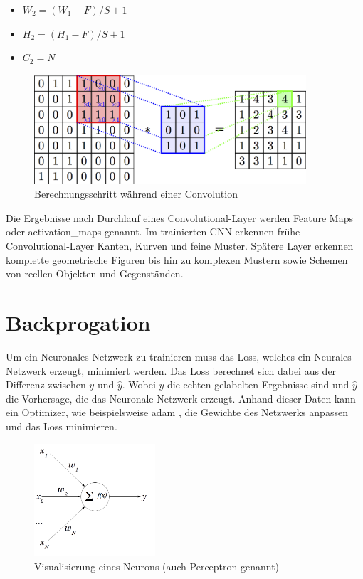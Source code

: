 \begin{itemize}
	\item $ W_2 = (W_1 - F) / S + 1 $
	\item $ H_2 = (H_1 - F) / S + 1 $
	\item $ C_2 = N $
\end{itemize}

\begin{figure}[H]
	\centering
	\includegraphics[width=0.90\textwidth]{resources/content/cnn/convolution_croped.png}
	\caption{Berechnungsschritt während einer Convolution \cite{convolution_img}}
	\label{img:convolution_img}
\end{figure}

Die Ergebnisse nach Durchlauf eines Convolutional-Layer werden Feature Maps oder \gls{activation_map}s genannt. Im trainierten CNN erkennen frühe Convolutional-Layer Kanten, Kurven und feine Muster. Spätere Layer erkennen komplette geometrische Figuren bis hin zu komplexen Mustern sowie Schemen von reellen Objekten und Gegenständen.

\section{Backprogation}
\label{sec:backpropagation}

Um ein Neuronales Netzwerk zu trainieren muss das Loss, welches ein Neurales Netzwerk erzeugt, minimiert werden. Das Loss berechnet sich dabei aus der Differenz zwischen $ y $ und $ \hat{y} $. Wobei $ y $ die echten gelabelten Ergebnisse sind und $ \hat{y} $ die Vorhersage, die das Neuronale Netzwerk erzeugt.
Anhand dieser Daten kann ein Optimizer, wie beispielsweise \gls{adam} \cite{kingma2015adam}, die Gewichte des Netzwerks anpassen und das Loss minimieren.

\begin{figure}[H]
	\centering
	\includegraphics[width=0.4\textwidth]{resources/content/perceptron.png}
	\caption{Visualisierung eines Neurons (auch Perceptron \cite{80230} genannt) \cite{perceptron_img}}
	\label{img:perceptron_img}
\end{figure}

